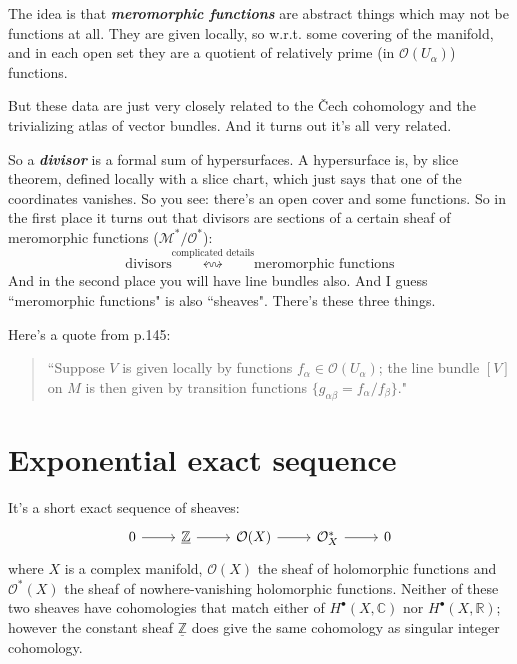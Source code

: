 \begin{thing7}{The idea}\leavevmode
is that \textit{\textbf{meromorphic functions}} are abstract things which may not be functions at all. They are given locally, so w.r.t. some covering of the manifold, and in each open set they are a quotient of relatively prime (in \(\mathcal{O}(U_\alpha)\)) functions.

But these data are just very closely related to the Čech cohomology and the trivializing atlas of vector bundles. And it turns out it's all very related.

So a \textit{\textbf{divisor}} is a formal sum of hypersurfaces. A hypersurface is, by \cite{les} slice theorem, defined locally with a slice chart, which just says that one of the coordinates vanishes. So you see: there's an open cover and some functions. So in the first place it turns out that divisors are sections of a certain sheaf of meromorphic functions (\(\mathcal{M}^*/\mathcal{O}^*\)):
\[ \text{divisors} \overset{\text{complicated details} }{\leftrightsquigarrow}\text{meromorphic functions} \]
And in the second place you will have line bundles also. And I guess ``meromorphic functions" is also ``sheaves". There's these three things.

Here's a quote from \cite{gri} p.145:
\begin{quotation}
	``Suppose \(V\) is given locally by functions \(f_\alpha \in \mathcal{O}(U_\alpha)\); the line bundle \([V]\) on \(M\) is then given by transition functions \(\{g_{\alpha \beta}=f_\alpha/f_\beta\}\)."
\end{quotation}

\end{thing7}

\section{Exponential exact sequence}

It's a short exact sequence of sheaves:
\[\begin{tikzcd}0\arrow[r]&\underline{\mathbb{Z}}\arrow[r]&\mathcal{O}(X)\arrow[r]&\mathcal{O}^*_X\arrow[r]&0\end{tikzcd}\]
where \(X\) is a complex manifold, \(\mathcal{O}(X)\) the sheaf of holomorphic functions and \(\mathcal{O} ^*(X)\) the sheaf of nowhere-vanishing holomorphic functions. Neither of these two sheaves have cohomologies that match either of \(H^{\bullet}(X,\mathbb{C})\) nor \(H^{\bullet}(X,\mathbb{R})\); however the constant sheaf \(\underline{\mathbb{Z}}\) does give the same cohomology as singular integer cohomology.

